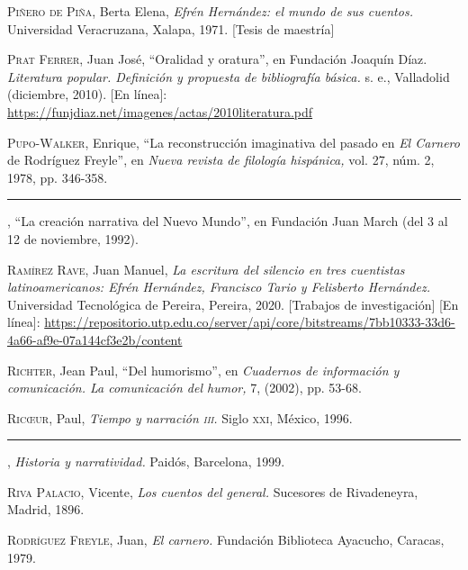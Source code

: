 \documentclass[14pt,twoside,final]{extbook} %
\begin{document}
\textsc{Piñero de Piña}, Berta Elena, \emph{Efrén Hernández: el mundo de sus cuentos.} Universidad Veracruzana, Xalapa, 1971. [Tesis de maestría]\label{bib:piñero1971}

\textsc{Prat Ferrer}, Juan José, ``Oralidad y oratura'', en Fundación Joaquín Díaz. \emph{Literatura popular. Definición y propuesta de bibliografía básica.} s. e., Valladolid (diciembre, 2010). [En línea]: \url{https://funjdiaz.net/imagenes/actas/2010literatura.pdf}\label{bib:prat2010}

\textsc{Pupo-Walker}, Enrique, ``La reconstrucción imaginativa del pasado en \emph{El Carnero} de Rodríguez Freyle'', en \emph{Nueva revista de filología hispánica,} vol. 27, núm. 2, 1978, pp. 346-358.\label{bib:pupowalker1978}

\rule{1cm}{0.4pt}, ``La creación narrativa del Nuevo Mundo'', en Fundación Juan March (del 3 al 12 de noviembre, 1992).\label{bib:pupowalker1992}

\textsc{Ramírez Rave}, Juan Manuel, \emph{La escritura del silencio en tres cuentistas latinoamericanos: Efrén Hernández, Francisco Tario y Felisberto Hernández.} Universidad Tecnológica de Pereira, Pereira, 2020. [Trabajos de investigación] [En línea]: \url{https://repositorio.utp.edu.co/server/api/core/bitstreams/7bb10333-33d6-4a66-af9e-07a144cf3e2b/content} \label{bib:ramírez2020}

\textsc{Richter}, Jean Paul, ``Del humorismo'', en \emph{Cuadernos de información y comunicación. La comunicación del humor,} 7, (2002), pp. 53-68.\label{bib:richter2002}

\textsc{Ric\oe ur}, Paul, \emph{Tiempo y narración \textsc{iii}.} Siglo \textsc{xxi}, México, 1996.

\rule{1cm}{0.4pt}, \emph{Historia y narratividad.} Paidós, Barcelona, 1999.

\textsc{Riva Palacio}, Vicente, \emph{Los cuentos del general.} Sucesores de Rivadeneyra, Madrid, 1896.\label{bib:rivapalacio1896}

\textsc{Rodríguez Freyle}, Juan, \emph{El carnero.} Fundación Biblioteca Ayacucho, Caracas, 1979.\label{bib:rodriguez1979}
\end{document}
